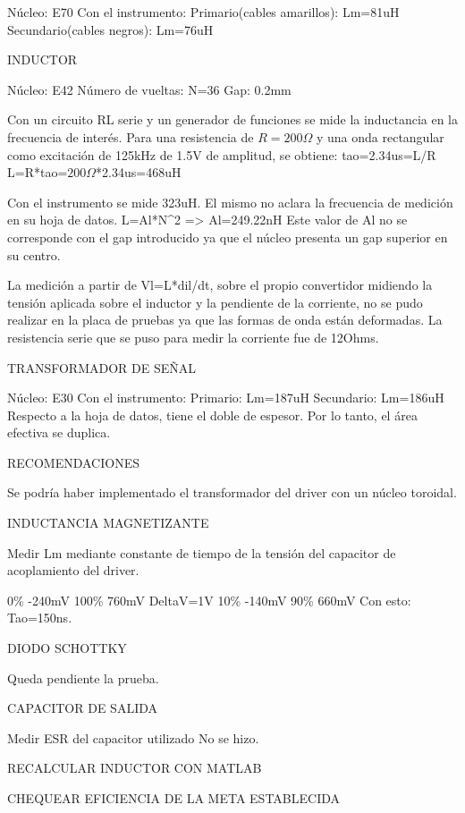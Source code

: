 Núcleo: E70
Con el instrumento:
Primario(cables amarillos): Lm=81uH
Secundario(cables negros): Lm=76uH

INDUCTOR

Núcleo: E42
Número de vueltas: N=36
Gap: 0.2mm

Con un circuito RL serie y un generador de funciones se mide la inductancia en la frecuencia de interés.
Para una resistencia de $R=200\Omega$ y una onda rectangular como excitación de 125kHz de 1.5V de amplitud, se obtiene:
tao=2.34us=L/R
L=R*tao=$200\Omega$*2.34us=468uH

Con el instrumento se mide 323uH. El mismo no aclara la frecuencia de medición en su hoja de datos. 
L=Al*N^2 => Al=249.22nH
Este valor de Al no se corresponde con el gap introducido ya que el núcleo presenta un gap superior en su centro. 

La medición a partir de Vl=L*dil/dt, sobre el propio convertidor midiendo la tensión aplicada sobre el inductor y la pendiente de la corriente, 
no se pudo realizar en la placa de pruebas ya que las formas de onda están deformadas. 
La resistencia serie que se puso para medir la corriente fue de 12Ohms. 

TRANSFORMADOR DE SEÑAL 

Núcleo: E30
Con el instrumento:
Primario: Lm=187uH
Secundario: Lm=186uH
Respecto a la hoja de datos, tiene el doble de espesor. 
Por lo tanto, el área efectiva se duplica. 

RECOMENDACIONES

Se podría haber implementado el transformador del driver con un núcleo toroidal. 

INDUCTANCIA MAGNETIZANTE

Medir Lm mediante constante de tiempo de la tensión del capacitor de acoplamiento del driver.

0\% -240mV
100\% 760mV
DeltaV=1V
10\% -140mV
90\% 660mV
Con esto:
Tao=150ns. 

DIODO SCHOTTKY

Queda pendiente la prueba. 

CAPACITOR DE SALIDA 

Medir ESR del capacitor utilizado
No se hizo. 

RECALCULAR INDUCTOR CON MATLAB

CHEQUEAR EFICIENCIA DE LA META ESTABLECIDA 